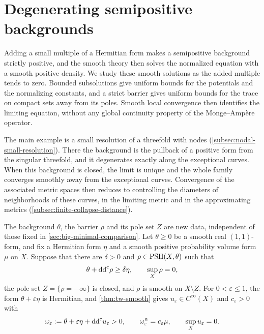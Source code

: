 \section{Degenerating semipositive backgrounds}
\label{sec:semipositive-degeneration}

Adding a small multiple of a Hermitian form makes a semipositive background strictly positive, and the smooth theory then solves the normalized equation with a smooth positive density. We study these smooth solutions as the added multiple tends to zero. Bounded subsolutions give uniform bounds for the potentials and the normalizing constants, and a strict barrier gives uniform bounds for the trace on compact sets away from its poles. Smooth local convergence then identifies the limiting equation, without any global continuity property of the Monge--Amp\`ere operator.

The main example is a small resolution of a threefold with nodes (\cref{subsec:nodal-small-resolution}). There the background is the pullback of a positive form from the singular threefold, and it degenerates exactly along the exceptional curves. When this background is closed, the limit is unique and the whole family converges smoothly away from the exceptional curves. Convergence of the associated metric spaces then reduces to controlling the diameters of neighborhoods of these curves, in the limiting metric and in the approximating metrics (\cref{subsec:finite-collapse-distance}).

The background $\theta$, the barrier $\rho$ and its pole set $Z$ are new data, independent of those fixed in \cref{sec:big-minimal-comparison}. Let $\theta\geq0$ be a smooth real $(1,1)$-form, and fix a Hermitian form $\eta$ and a smooth positive probability volume form $\mu$ on $X$. Suppose that there are $\delta>0$ and $\rho\in\mathrm{PSH}(X,\theta)$ such that
\begin{equation}\label{eq:degeneration-strict-barrier}
 \theta+\mathrm{dd}^{\mathrm{c}}\rho\geq\delta\eta,
 \qquad \sup_X\rho=0,
\end{equation}
the pole set $Z=\{\rho=-\infty\}$ is closed, and $\rho$ is smooth on $X\setminus Z$. For $0<\varepsilon\leq1$, the form $\theta+\varepsilon\eta$ is Hermitian, and \cref{thm:tw-smooth} gives $u_\varepsilon\in C^\infty(X)$ and $c_\varepsilon>0$ with
\begin{equation}\label{eq:semipositive-smooth-approximation}
 \omega_\varepsilon:=\theta+\varepsilon\eta+\mathrm{dd}^{\mathrm{c}} u_\varepsilon>0,
 \qquad \omega_\varepsilon^n=c_\varepsilon\mu,
 \qquad \sup_Xu_\varepsilon=0.
\end{equation}

